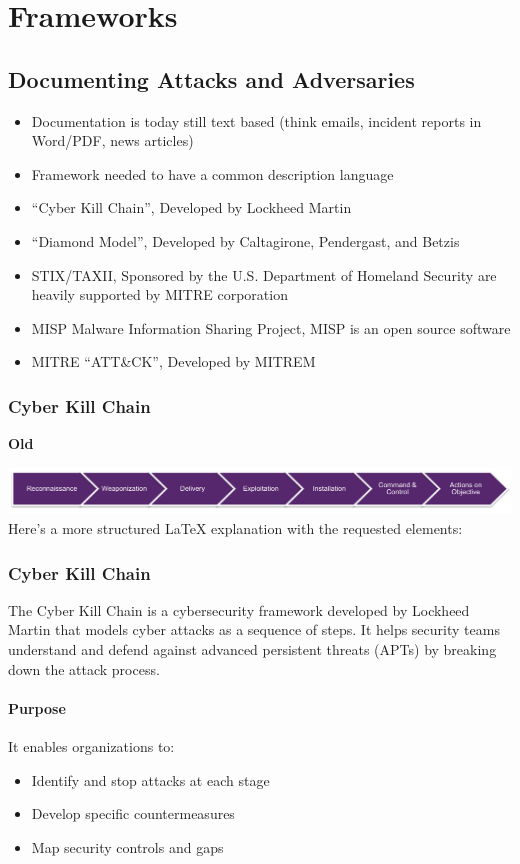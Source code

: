
\chapter{Frameworks}
\newpage

\section{Documenting Attacks and Adversaries}
\begin{itemize}
  \item Documentation is today still text based (think emails, incident reports in Word/PDF, news articles)
  \item Framework needed to have a common description language
  \item “Cyber Kill Chain”, Developed by Lockheed Martin
  \item “Diamond Model”, Developed by Caltagirone, Pendergast, and Betzis
  \item STIX/TAXII, Sponsored by the U.S. Department of Homeland Security are heavily supported by MITRE corporation
  \item MISP Malware Information Sharing Project, MISP is an open source software
  \item MITRE “ATT\&CK”, Developed by MITREM
\end{itemize}

\subsection{Cyber Kill Chain}
\textbf{Old}
\begin{center}
\includegraphics[width=\textwidth]{resources/09-cyber-kill-chain.png}
Here's a more structured LaTeX explanation with the requested elements:
\end{center}

\subsection{Cyber Kill Chain}
The Cyber Kill Chain is a cybersecurity framework developed by Lockheed Martin that models cyber attacks as a sequence of steps. It helps security teams understand and defend against advanced persistent threats (APTs) by breaking down the attack process.

\subsubsection{Purpose}
It enables organizations to:
\begin{itemize}
    \item Identify and stop attacks at each stage
    \item Develop specific countermeasures
    \item Map security controls and gaps
\end{itemize}

